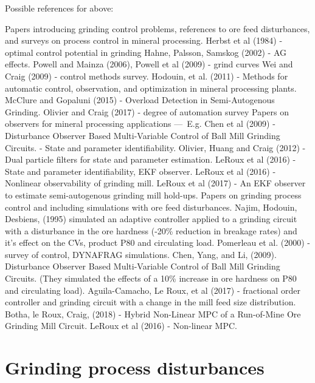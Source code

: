 Possible references for above:
\begin{outline}
	\1 Papers introducing grinding control problems, references to ore feed disturbances, and surveys on process control in mineral processing.
	\2 Herbst et al (1984) - optimal control potential in grinding
	\2 Hahne, Palsson, Samskog (2002) - AG effects.
	\2 Powell and Mainza (2006), Powell et al (2009) - grind curves
	\2 Wei and Craig (2009) - control methods survey.
	\2 Hodouin, et al. (2011) - Methods for automatic control, observation, and optimization in mineral processing plants.
	\2 McClure and Gopaluni (2015) - Overload Detection in Semi-Autogenous Grinding.
	\2 Olivier and Craig (2017) - degree of automation survey
	\1 Papers on observers for mineral processing applications — E.g. 
	\2 Chen et al (2009) - Disturbance Observer Based Multi-Variable Control of Ball Mill Grinding Circuits. %
	\2 \cite{le_roux_state_2016} - State and parameter identifiability. 
	\2 Olivier, Huang and Craig (2012) - Dual particle filters for state and parameter estimation.
	\2 LeRoux et al (2016) - State and parameter identifiability, EKF observer.
	\2 LeRoux et al (2016) - Nonlinear observability of grinding mill.
	\2 LeRoux et al (2017) - An EKF observer to estimate semi-autogenous grinding mill hold-ups.
	\1 Papers on grinding process control and including simulations with ore feed disturbances.
	\2 Najim, Hodouin, Desbiens, (1995) simulated an adaptive controller applied to a grinding circuit with a disturbance in the ore hardness (-20\% reduction in breakage rates) and it's effect on the CVs, product P80 and circulating load.
	\2 Pomerleau et al. (2000) - survey of control, DYNAFRAG simulations.
	\2 Chen, Yang, and Li, (2009). Disturbance Observer Based Multi-Variable Control of Ball Mill Grinding Circuits. (They simulated the effects of a 10\% increase in ore hardness on P80 and circulating load).
	\2 Aguila-Camacho, Le Roux, et al (2017) - fractional order controller and grinding circuit with a change in the mill feed size distribution.
	\2 Botha, le Roux, Craig, (2018) - Hybrid Non-Linear MPC of a Run-of-Mine Ore Grinding Mill Circuit.
	\2 LeRoux et al (2016) - Non-linear MPC.

\end{outline}

\section*{Grinding process disturbances}


